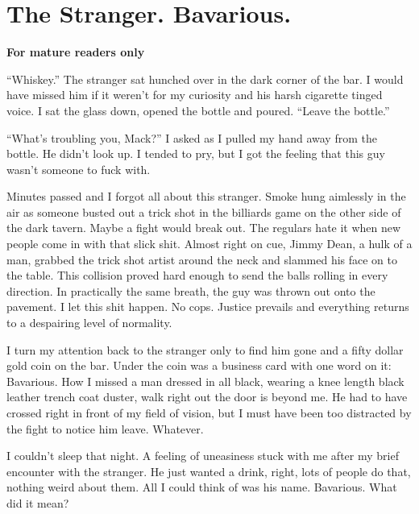 \chapter{The Stranger. Bavarious.}



{\bf For mature readers only}



``Whiskey.'' The stranger sat hunched over in the dark
corner of the bar. I would have missed him if it weren't for
my curiosity and his harsh cigarette tinged voice. I sat the glass
down, opened the bottle and poured. ``Leave the
bottle.''



``What's troubling you, Mack?'' I asked as I pulled
my hand away from the bottle. He didn't look up. I tended to
pry, but I got the feeling that this guy wasn't someone to
fuck with.



Minutes passed and I forgot all about this stranger. Smoke hung
aimlessly in the air as someone busted out a trick shot in the
billiards game on the other side of the dark tavern. Maybe a fight
would break out. The regulars hate it when new people come in with
that slick shit. Almost right on cue, Jimmy Dean, a hulk of a man,
grabbed the trick shot artist around the neck and slammed his face
on to the table. This collision proved hard enough to send the
balls rolling in every direction. In practically the same breath,
the guy was thrown out onto the pavement. I let this shit happen.
No cops. Justice prevails and everything returns to a despairing
level of normality.



I turn my attention back to the stranger only to find him gone and
a fifty dollar gold coin on the bar. Under the coin was a business
card with one word on it: Bavarious. How I missed a man dressed in
all black, wearing a knee length black leather trench coat duster,
walk right out the door is beyond me. He had to have crossed right
in front of my field of vision, but I must have been too distracted
by the fight to notice him leave. Whatever.



I couldn't sleep that night. A feeling of uneasiness stuck
with me after my brief encounter with the stranger. He just wanted
a drink, right, lots of people do that, nothing weird about them.
All I could think of was his name. Bavarious. What did it
mean?



